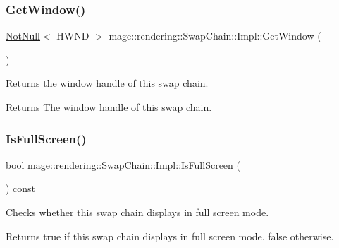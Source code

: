 \subsubsection{\texorpdfstring{Get\+Window()}{GetWindow()}}
{\footnotesize\ttfamily \hyperlink{namespacemage_a8769f9d670d6b585ea306cb1062af94b}{Not\+Null}$<$ H\+W\+ND $>$ mage\+::rendering\+::\+Swap\+Chain\+::\+Impl\+::\+Get\+Window (\begin{DoxyParamCaption}{ }\end{DoxyParamCaption})\hspace{0.3cm}{\ttfamily [noexcept]}}

Returns the window handle of this swap chain.

\begin{DoxyReturn}{Returns}
The window handle of this swap chain. 
\end{DoxyReturn}
\hypertarget{classmage_1_1rendering_1_1_swap_chain_1_1_impl_abd74163f68b0a078f970d3d54d1dcd7e}{}\label{classmage_1_1rendering_1_1_swap_chain_1_1_impl_abd74163f68b0a078f970d3d54d1dcd7e} 
\subsubsection{\texorpdfstring{Is\+Full\+Screen()}{IsFullScreen()}}
{\footnotesize\ttfamily bool mage\+::rendering\+::\+Swap\+Chain\+::\+Impl\+::\+Is\+Full\+Screen (\begin{DoxyParamCaption}{ }\end{DoxyParamCaption}) const\hspace{0.3cm}{\ttfamily [noexcept]}}

Checks whether this swap chain displays in full screen mode.

\begin{DoxyReturn}{Returns}
{\ttfamily true} if this swap chain displays in full screen mode. {\ttfamily false} otherwise. 
\end{DoxyReturn}
\hypertarget{classmage_1_1rendering_1_1_swap_chain_1_1_impl_a47dd7e6a9a21395fc4d79dfda3d9cd61}{}\label{classmage_1_1rendering_1_1_swap_chain_1_1_impl_a47dd7e6a9a21395fc4d79dfda3d9cd61} 
